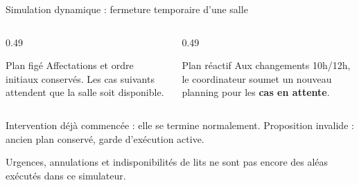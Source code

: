 \documentclass[aspectratio=169,10pt]{beamer}
\newcommand{\source}[1]{\par\vfill{\color{McmMuted}\tiny #1}}
\begin{document}
\begin{frame}{Simulation dynamique : fermeture temporaire d'une salle}
  \small
  \centering
  \vspace{0.45cm}
  \begin{columns}[T,onlytextwidth]
    \begin{column}{0.49\textwidth}
      \begin{block}{Plan figé}
        \small Affectations et ordre initiaux conservés.
        Les cas suivants attendent que la salle soit disponible.
      \end{block}
    \end{column}
    \begin{column}{0.49\textwidth}
      \begin{exampleblock}{Plan réactif}
        \small Aux changements 10h/12h, le coordinateur soumet un
        nouveau planning pour les \textbf{cas en attente}.
      \end{exampleblock}
    \end{column}
  \end{columns}
  \vspace{0.10cm}
  \centering\small Intervention déjà commencée : elle se termine normalement.
  Proposition invalide : ancien plan conservé, garde d'exécution active.
  \source{Urgences, annulations et indisponibilités de lits ne sont pas encore des aléas exécutés dans ce simulateur.}
\end{frame}
\end{document}
